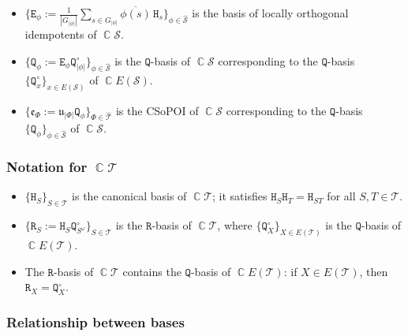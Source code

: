 \documentclass[11pt, oneside, reqno]{amsart}
\theoremstyle{definition}
\numberwithin{equation}{section}
\DeclareMathOperator{\C}{\mathbb{C}}
\def \SS{{\mathcal{S}}}
\def \TT{{\mathcal{T}}}
\def \kk{\C}
\def \uu{{\mathfrak{u}}}
\def \ee{{\mathfrak{e}}}
\def \wh{\widehat}
\newcommand{\B}[1]{\mathtt{#1}} 			%
\begin{document}
\begin{itemize}[wide]
    \item
        $\{\B{E}_{\phi} := \frac{1}{|G_{|\phi|}|} \sum_{s \in G_{|\phi|}}
        \overline{\phi(s)} \, \B{H}_{s} \}_{\phi \in \wh{\SS}}$ is the basis of
        locally orthogonal idempotents of $\kk \SS$.

    \item
        $\{\B{Q}_{\phi} := \B{E}_{\phi} \B{Q}^\circ_{|\phi|} \}_{\phi \in \wh{\SS}}$
        is the $\B{Q}$-basis of $\kk \SS$ corresponding to
        the $\B{Q}$-basis $\{\B{Q}^\circ_{x} \}_{x \in E(\SS)}$ of $\kk E(\SS)$.

    \item
        $\{\ee_{\Phi} := \uu_{|\Phi|} \B{Q}_{\phi} \}_{\Phi \in \wh{\TT}}$
        is the CSoPOI of $\kk \SS$ corresponding to
        the $\B{Q}$-basis $\{\B{Q}_{\phi} \}_{\phi \in \wh{\SS}}$ of $\kk \SS$.
\end{itemize}

\subsubsection*{Notation for $\kk \TT$}

\begin{itemize}[wide]
    \item
        $\{\B{H}_{S}\}_{S \in \TT}$ is the canonical basis of $\kk \TT$;
        it satisfies $\B{H}_{S} \B{H}_{T} = \B{H}_{ST}$ for all $S, T \in \TT$.

    \item
        $\{\B{R}_{S} := \B{H}_{S} \B{Q}^\circ_{S^\omega}\}_{S \in \TT}$
        is the $\B{R}$-basis of $\kk \TT$,
        where $\{\B{Q}^\circ_{X}\}_{X \in E(\TT)}$ is the $\B{Q}$-basis of $\kk E(\TT)$.

    \item
        The $\B{R}$-basis of $\kk \TT$ contains the
        $\B{Q}$-basis of $\kk E(\TT)$:
        if $X \in E(\TT)$, then $\B{R}_{X} = \B{Q}^\circ_{X}$.
\end{itemize}

\subsubsection*{Relationship between bases}
\end{document}
